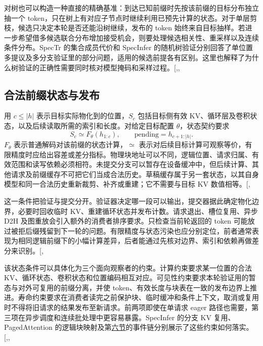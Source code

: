 \documentclass[
  a4paper,
  UTF8,
  fontset=none,
  zihao=5]{ctexart}
\begin{document}
对树也可以构造一种直接的精确基准：到达已知前缀时先按该前缀的目标分布独立抽一个
token，只在树上有对应子节点时继续利用已预先计算的状态。对于单层剪枝，候选只决定本轮是否还能沿树继续，发布的
token
始终来自目标抽样。若进一步希望借多候选联合分布增加接受机会，则要处理候选相关性、重采样以及连续条件分布。SpecTr
的集合成员代价和 SpecInfer
的随机树验证分别回答了单位置多提议及多分支验证里的部分问题，适用的候选前提各有区别。这里也解释了为什么树验证的正确性需要同时核对模型掩码和采样过程。{[},,\citeproc{ref-sequoia}{32}{]}

\subsection{合法前缀状态与发布}\label{state-invariant}

用 \(c\le |h|\) 表示目标实际物化到的位置，\(S_c\) 包括目标侧有效
KV、循环层及卷积状态，以及后续读取所需的索引和长度。对给定目标配置
\(\theta\)，状态契约要求 \[
S_c \simeq F_{\theta}(h_{1:c}),\qquad
\mathrm{pending}=h_{c+1:|h|}.
\] \(F_{\theta}\) 表示普通解码对该前缀的状态计算，\(\simeq\)
表示对后续目标计算可观察等价，有限精度时应给出容差或差分指标。物理块地址可以不同，逻辑位置、请求归属、有效范围和读写依赖必须相符。未提交分支可以暂存在设备缓冲中，但后续计算、其他请求及前缀缓存不可把它们当成合法历史。草稿缓存属于另一套状态，以其自身模型和同一合法历史重新裁剪、补齐或重建；它不需要与目标
KV
数值相等。{[},\citeproc{ref-specinfer}{8}{]}

这一条件把验证与提交分开。验证器决定哪一段可以输出，提交器据此确定物化边界，必要时回收临时
KV、重建循环状态并发布计数。请求退出、槽位复用、异步 D2H
及图重放会引入额外的消费者排序要求。只检查当前轮返回的 token
可能放过被拒后缀残留到下一轮的问题。有限精度与状态污染也应分别定位，前者通常表现为相同逻辑前缀下的小幅计算差异，后者能通过先核对边界、索引和依赖再做差分来识别。{[},\citeproc{ref-specinfer}{8}{]}

该状态条件可以具体化为三个面向观察者的约束。计算约束要求某一位置的合法
KV、循环状态、卷积状态和位置编码相互对应。可见性约束要求本轮验证用的暂态与对外可复用的前缀分离，并使
token、有效长度与块表在一致的发布边界上推进。寿命约束要求在消费者读完之前保护块、临时缓冲和条件上下文，取消或复用时不得将旧请求的结果发布至新请求。前两项即使在单请求
eager 路径也需要，第三项在异步调度和连续批处理中更容易暴露。SpecInfer
的分支 KV 复用、PagedAttention
的逻辑块映射及第\hyperref[runtime]{六节}的事件链分别展示了这些约束如何落实。{[},,\citeproc{ref-pagedattention}{34}{]}
\end{document}
